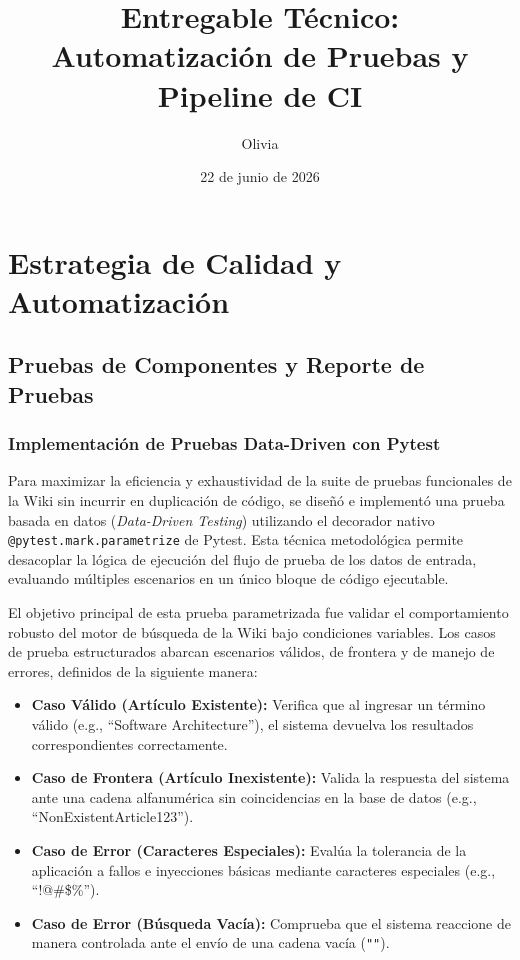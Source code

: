 \documentclass[12pt,letterpaper]{article}
\begin{document}
\title{Entregable Técnico: Automatización de Pruebas y Pipeline de CI}
\author{Olivia}
\date{22 de junio de 2026}
\maketitle

\section{Estrategia de Calidad y Automatización}

\subsection{Pruebas de Componentes y Reporte de Pruebas}

\subsubsection{Implementación de Pruebas Data-Driven con Pytest}
Para maximizar la eficiencia y exhaustividad de la suite de pruebas funcionales de la Wiki sin incurrir en duplicación de código, se diseñó e implementó una prueba basada en datos (\textit{Data-Driven Testing}) utilizando el decorador nativo \texttt{@pytest.mark.parametrize} de Pytest. Esta técnica metodológica permite desacoplar la lógica de ejecución del flujo de prueba de los datos de entrada, evaluando múltiples escenarios en un único bloque de código ejecutable.

El objetivo principal de esta prueba parametrizada fue validar el comportamiento robusto del motor de búsqueda de la Wiki bajo condiciones variables. Los casos de prueba estructurados abarcan escenarios válidos, de frontera y de manejo de errores, definidos de la siguiente manera:
\begin{itemize}
    \item \textbf{Caso Válido (Artículo Existente):} Verifica que al ingresar un término válido (e.g., ``Software Architecture''), el sistema devuelva los resultados correspondientes correctamente.
    \item \textbf{Caso de Frontera (Artículo Inexistente):} Valida la respuesta del sistema ante una cadena alfanumérica sin coincidencias en la base de datos (e.g., ``NonExistentArticle123'').
    \item \textbf{Caso de Error (Caracteres Especiales):} Evalúa la tolerancia de la aplicación a fallos e inyecciones básicas mediante caracteres especiales (e.g., ``!@\#\$\%'').
    \item \textbf{Caso de Error (Búsqueda Vacía):} Comprueba que el sistema reaccione de manera controlada ante el envío de una cadena vacía (\texttt{""}).
\end{itemize}
\end{document}

